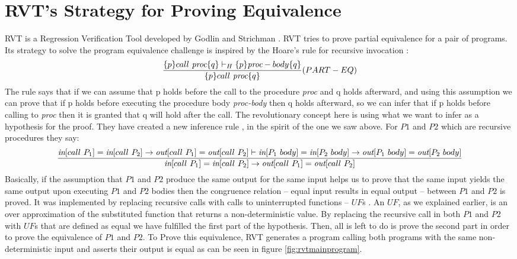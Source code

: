 \label{sec:rvtreview}
\section{RVT's Strategy for Proving Equivalence}
RVT is a Regression Verification Tool developed by Godlin and Strichman \cite{DBLP:conf/dac/GodlinS09}. RVT tries to prove partial equivalence for a pair of programs. Its strategy to solve the program equivalence challenge is inspired by the Hoare's rule for recursive invocation \cite{DBLP:series/lnm/Hoare71}: 
\begin{equation}
 {\frac {\{p\} call\ \emph{proc} \{q\} \vdash_H \{p\} \emph{proc}-body \{q\}}{\{p\} call\ \emph{proc} \{q\}}} 
  (PART-EQ)
 \end{equation}
The rule says that if we can assume that {p} holds before the call to the procedure \emph{proc} and {q} holds afterward, and using this assumption we can prove that if {p} holds before executing the procedure body \emph{proc-body} then {q} holds afterward, so we can infer that if {p} holds before calling to \emph{proc} then it is granted that {q} will hold after the call. The revolutionary concept here is using what we want to infer as a hypothesis for the proof. They have created a new inference rule \cite{DBLP:conf/dac/GodlinS09}, in the spirit of the one we saw above. For $P1$ and $P2$ which are recursive procedures they say:
\begin{equation}
 {\frac {{\emph{in}[call\ P_1]=\emph{in}[call\ P_2]\rightarrow \emph{out}[call\ P_1]=\emph{out}[call\ P_2]} \vdash{\emph{in}[P_1\ body]=\emph{in}[P_2\ body]\rightarrow \emph{out}[P_1\ body]=\emph{out}[P_2\ body]} }
{{\emph{in}[call\ P_1]=\emph{in}[call\ P_2]\rightarrow \emph{out}[call\ P_1]=\emph{out}[call\ P_2]}}} 
\end{equation}
Basically, if the assumption that $P1$ and $P2$ produce the same output for the same input helps us to prove that the same input yields the same output upon executing $P1$ and $P2$ bodies then the congruence relation – equal input results in equal output – between $P1$ and $P2$ is proved. It was implemented by replacing recursive calls with calls to uninterrupted functions – $UF$s . An $UF$, as we explained earlier, is an over approximation of the substituted function that returns a non-deterministic value. By replacing the recursive call in both $P1$ and $P2$ with $UF$s that are defined as equal we have fulfilled the first part of the hypothesis. Then, all is left to do is prove the second part in order to prove the equivalence of $P1$ and $P2$. To Prove this equivalence, RVT generates a program calling both programs with the same non-deterministic input and asserts their output is equal as can be seen in figure \ref{fig:rvtmainprogram}.
